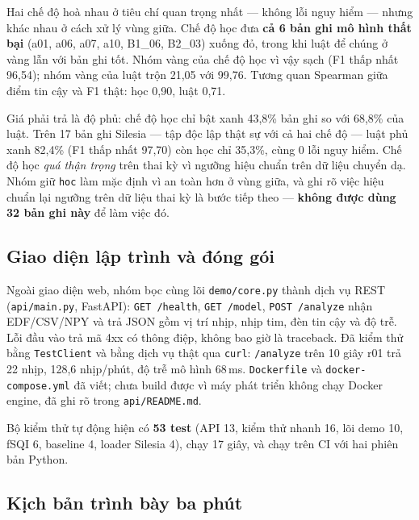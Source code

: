 Hai chế độ hoà nhau ở tiêu chí quan trọng nhất --- không lỗi nguy hiểm --- nhưng khác nhau ở cách xử lý
vùng giữa. Chế độ học đưa \textbf{cả 6 bản ghi mô hình thất bại} (a01, a06, a07, a10, B1\_06, B2\_03)
xuống đỏ, trong khi luật để chúng ở vàng lẫn với bản ghi tốt. Nhóm vàng của chế độ học vì vậy sạch
(F1 thấp nhất 96,54); nhóm vàng của luật trộn 21,05 với 99,76. Tương quan Spearman giữa điểm tin cậy và F1
thật: học 0,90, luật 0,71.

Giá phải trả là độ phủ: chế độ học chỉ bật xanh 43,8\% bản ghi so với 68,8\% của luật. Trên 17 bản ghi
Silesia --- tập độc lập thật sự với cả hai chế độ --- luật phủ xanh 82,4\% (F1 thấp nhất 97,70) còn học chỉ
35,3\%, cùng 0 lỗi nguy hiểm. Chế độ học \textit{quá thận trọng} trên thai kỳ vì ngưỡng hiệu chuẩn trên dữ
liệu chuyển dạ. Nhóm giữ \texttt{hoc} làm mặc định vì an toàn hơn ở vùng giữa, và ghi rõ việc hiệu chuẩn
lại ngưỡng trên dữ liệu thai kỳ là bước tiếp theo --- \textbf{không được dùng 32 bản ghi này} để làm việc đó.

\subsection{Giao diện lập trình và đóng gói}

Ngoài giao diện web, nhóm bọc cùng lõi \texttt{demo/core.py} thành dịch vụ REST (\texttt{api/main.py},
FastAPI): \texttt{GET /health}, \texttt{GET /model}, \texttt{POST /analyze} nhận EDF/CSV/NPY và trả JSON
gồm vị trí nhịp, nhịp tim, đèn tin cậy và độ trễ. Lỗi đầu vào trả mã 4xx có thông điệp, không bao giờ là
traceback. Đã kiểm thử bằng \texttt{TestClient} và bằng dịch vụ thật qua \texttt{curl}: \texttt{/analyze}
trên 10 giây r01 trả 22 nhịp, 128,6 nhịp/phút, độ trễ mô hình 68\,ms. \texttt{Dockerfile} và
\texttt{docker-compose.yml} đã viết; chưa build được vì máy phát triển không chạy Docker engine, đã ghi
rõ trong \texttt{api/README.md}.

Bộ kiểm thử tự động hiện có \textbf{53 test} (API 13, kiểm thử nhanh 16, lõi demo 10, fSQI 6, baseline 4,
loader Silesia 4), chạy 17 giây, và chạy trên CI với hai phiên bản Python.

\subsection{Kịch bản trình bày ba phút}

